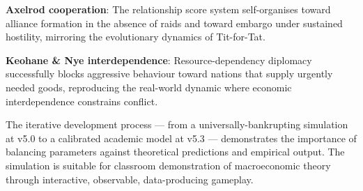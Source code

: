\documentclass[12pt,a4paper]{article}
\begin{document}
\textbf{Axelrod cooperation}: The relationship score system self-organises toward alliance formation in the absence of raids and toward embargo under sustained hostility, mirroring the evolutionary dynamics of Tit-for-Tat.

\textbf{Keohane \& Nye interdependence}: Resource-dependency diplomacy successfully blocks aggressive behaviour toward nations that supply urgently needed goods, reproducing the real-world dynamic where economic interdependence constrains conflict.

The iterative development process --- from a universally-bankrupting simulation at v5.0 to a calibrated academic model at v5.3 --- demonstrates the importance of balancing parameters against theoretical predictions and empirical output. The simulation is suitable for classroom demonstration of macroeconomic theory through interactive, observable, data-producing gameplay.
\end{document}
